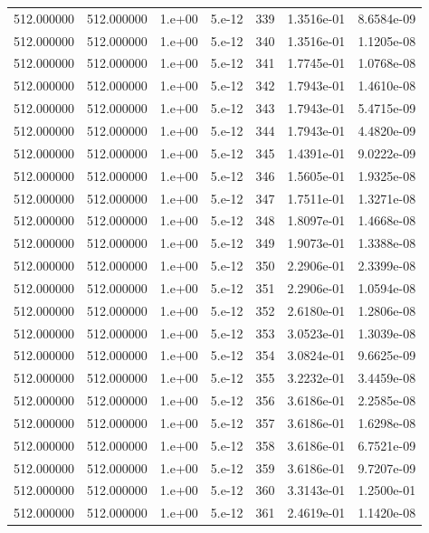 \begin{table}[htbp]
\begin{tabular}{rrrrrrr}
512.000000 & 512.000000 & 1.e+00 & 5.e-12 & 339 & 1.3516e-01 & 8.6584e-09 \\
512.000000 & 512.000000 & 1.e+00 & 5.e-12 & 340 & 1.3516e-01 & 1.1205e-08 \\
512.000000 & 512.000000 & 1.e+00 & 5.e-12 & 341 & 1.7745e-01 & 1.0768e-08 \\
512.000000 & 512.000000 & 1.e+00 & 5.e-12 & 342 & 1.7943e-01 & 1.4610e-08 \\
512.000000 & 512.000000 & 1.e+00 & 5.e-12 & 343 & 1.7943e-01 & 5.4715e-09 \\
512.000000 & 512.000000 & 1.e+00 & 5.e-12 & 344 & 1.7943e-01 & 4.4820e-09 \\
512.000000 & 512.000000 & 1.e+00 & 5.e-12 & 345 & 1.4391e-01 & 9.0222e-09 \\
512.000000 & 512.000000 & 1.e+00 & 5.e-12 & 346 & 1.5605e-01 & 1.9325e-08 \\
512.000000 & 512.000000 & 1.e+00 & 5.e-12 & 347 & 1.7511e-01 & 1.3271e-08 \\
512.000000 & 512.000000 & 1.e+00 & 5.e-12 & 348 & 1.8097e-01 & 1.4668e-08 \\
512.000000 & 512.000000 & 1.e+00 & 5.e-12 & 349 & 1.9073e-01 & 1.3388e-08 \\
512.000000 & 512.000000 & 1.e+00 & 5.e-12 & 350 & 2.2906e-01 & 2.3399e-08 \\
512.000000 & 512.000000 & 1.e+00 & 5.e-12 & 351 & 2.2906e-01 & 1.0594e-08 \\
512.000000 & 512.000000 & 1.e+00 & 5.e-12 & 352 & 2.6180e-01 & 1.2806e-08 \\
512.000000 & 512.000000 & 1.e+00 & 5.e-12 & 353 & 3.0523e-01 & 1.3039e-08 \\
512.000000 & 512.000000 & 1.e+00 & 5.e-12 & 354 & 3.0824e-01 & 9.6625e-09 \\
512.000000 & 512.000000 & 1.e+00 & 5.e-12 & 355 & 3.2232e-01 & 3.4459e-08 \\
512.000000 & 512.000000 & 1.e+00 & 5.e-12 & 356 & 3.6186e-01 & 2.2585e-08 \\
512.000000 & 512.000000 & 1.e+00 & 5.e-12 & 357 & 3.6186e-01 & 1.6298e-08 \\
512.000000 & 512.000000 & 1.e+00 & 5.e-12 & 358 & 3.6186e-01 & 6.7521e-09 \\
512.000000 & 512.000000 & 1.e+00 & 5.e-12 & 359 & 3.6186e-01 & 9.7207e-09 \\
512.000000 & 512.000000 & 1.e+00 & 5.e-12 & 360 & 3.3143e-01 & 1.2500e-01 \\
512.000000 & 512.000000 & 1.e+00 & 5.e-12 & 361 & 2.4619e-01 & 1.1420e-08 \\

\end{tabular}
\end{table}
